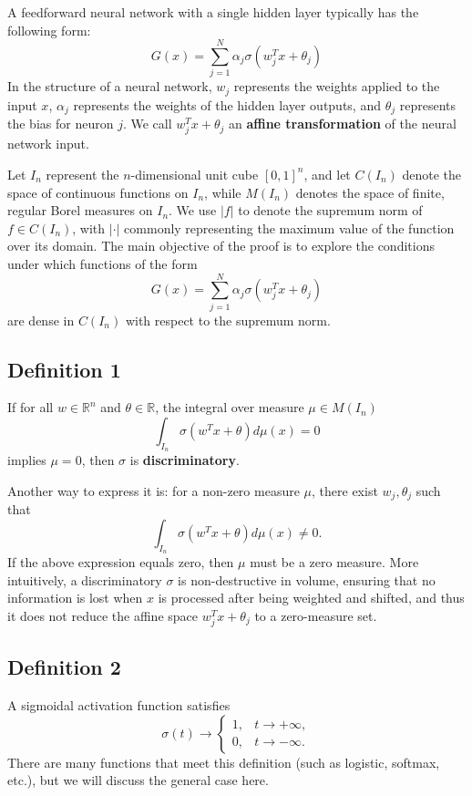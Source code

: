 \documentclass[11p,oneside]{book}
\begin{document}
A feedforward neural network with a single hidden layer typically has the following form:
\[
G(x) = \sum_{j=1}^{N} \alpha_j \sigma(w_j^T x + \theta_j)
\]
In the structure of a neural network, $w_j$ represents the weights applied to the input $x$, $\alpha_j$ represents the weights of the hidden layer outputs, and $\theta_j$ represents the bias for neuron $j$. We call $w_j^T x + \theta_j$ an \textbf{affine transformation} of the neural network input.

Let $I_n$ represent the $n$-dimensional unit cube $[0, 1]^n$, and let $C(I_n)$ denote the space of continuous functions on $I_n$, while $M(I_n)$ denotes the space of finite, regular Borel measures on $I_n$. We use $|f|$ to denote the supremum norm of $f \in C(I_n)$, with $|\cdot|$ commonly representing the maximum value of the function over its domain. The main objective of the proof is to explore the conditions under which functions of the form
\[
G(x) = \sum_{j=1}^{N} \alpha_j \sigma(w_j^T x + \theta_j)
\]
are dense in $C(I_n)$ with respect to the supremum norm.

\subsection*{Definition 1}
If for all $w \in \mathbb{R}^n$ and $\theta \in \mathbb{R}$, the integral over measure $\mu \in M(I_n)$
\[
\int_{I_n} \sigma(w^T x + \theta) d\mu(x) = 0
\]
implies $\mu = 0$, then $\sigma$ is \textbf{discriminatory}.

Another way to express it is: for a non-zero measure $\mu$, there exist $w_j, \theta_j$ such that
\[
\int_{I_n} \sigma(w^T x + \theta) d\mu(x) \neq 0.
\]
If the above expression equals zero, then $\mu$ must be a zero measure. More intuitively, a discriminatory $\sigma$ is non-destructive in volume, ensuring that no information is lost when $x$ is processed after being weighted and shifted, and thus it does not reduce the affine space $w_j^T x + \theta_j$ to a zero-measure set.

\subsection*{Definition 2}
A sigmoidal activation function satisfies
\[
\sigma(t) \to
\begin{cases}
1, & t \to +\infty, \\
0, & t \to -\infty.
\end{cases}
\]
There are many functions that meet this definition (such as logistic, softmax, etc.), but we will discuss the general case here.
\end{document}
